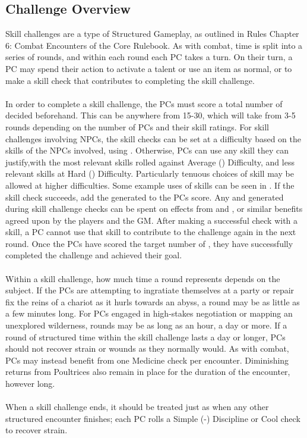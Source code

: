 \begin{multicols}{2}
\subsection{Challenge Overview}
Skill challenges are a type of Structured Gameplay, as outlined in Rules Chapter 6: Combat Encounters
of the Core Rulebook. As with combat, time is split into a series of rounds, and within each round
each PC takes a turn. On their turn, a PC may spend their action to activate a talent or use an item
as normal, or to make a skill check that contributes to completing the skill challenge.\\
\\
In order to complete a skill challenge, the PCs must score a total number of \success decided beforehand.
This can be anywhere from 15-30, which will take from 3-5 rounds depending on the number of PCs and their
skill ratings. For skill challenges involving NPCs, the skill checks can be set at a difficulty based on
the skills of the NPCs involved, using . Otherwise,
PCs can use any skill they can justify,with the most relevant skills rolled against Average (\difficulty\difficulty)
Difficulty, and less relevant skills at Hard (\difficulty\difficulty\difficulty) Difficulty. Particularly
tenuous choices of skill may be allowed at higher difficulties. Some example uses of skills can be seen in
. If the skill check succeeds, add the \success generated to the PCs score.
Any \advantage \triumph \threat and \despair generated during skill challenge checks can be spent on effects
from  and , or similar benefits agreed
upon by the players and the GM. After making a successful check with a skill, a PC cannot use that skill to
contribute to the challenge again in the next round. Once the PCs have scored the target number of \success,
they have successfully completed the challenge and achieved their goal.\\
\\
Within a skill challenge, how much time a round represents depends on the subject. If the PCs are attempting
to ingratiate themselves at a party or repair fix the reins of a chariot as it hurls towards an abyss, a
round may be as little as a few minutes long. For PCs engaged in high-stakes negotiation or mapping an unexplored
wilderness, rounds may be as long as an hour, a day or more. If a round of structured time within the skill
challenge lasts a day or longer, PCs should not recover strain or wounds as they normally would. As with
combat, PCs may instead benefit from one Medicine check per encounter. Diminishing returns from Poultrices also
remain in place for the duration of the encounter, however long.\\
\\
When a skill challenge ends, it should be treated just as when any other structured encounter finishes; each
PC rolls a Simple (-) Discipline or Cool check to recover strain.


\end{multicols}
